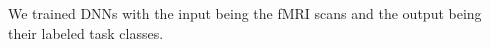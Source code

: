 \label{fig:dnn}
We trained DNNs with the input being the fMRI scans and the output being their labeled task classes.